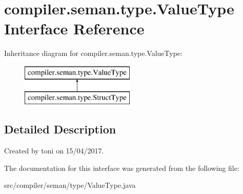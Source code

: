 \hypertarget{interfacecompiler_1_1seman_1_1type_1_1_value_type}{}\section{compiler.\+seman.\+type.\+Value\+Type Interface Reference}
\label{interfacecompiler_1_1seman_1_1type_1_1_value_type}
Inheritance diagram for compiler.\+seman.\+type.\+Value\+Type\+:\begin{figure}[H]
\begin{center}
\leavevmode
\includegraphics[height=2.000000cm]{interfacecompiler_1_1seman_1_1type_1_1_value_type}
\end{center}
\end{figure}


\subsection{Detailed Description}
Created by toni on 15/04/2017. 

The documentation for this interface was generated from the following file\+:\begin{DoxyCompactItemize}
\item 
src/compiler/seman/type/Value\+Type.\+java\end{DoxyCompactItemize}
